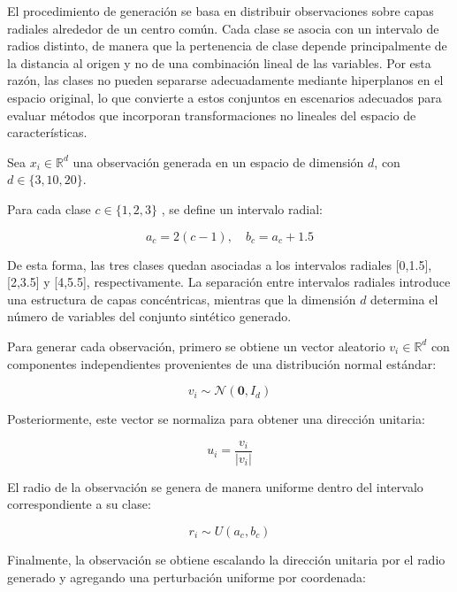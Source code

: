 El procedimiento de generación se basa en distribuir observaciones sobre capas radiales alrededor de un centro común. Cada clase se asocia con un intervalo de radios distinto, de manera que la pertenencia de clase depende principalmente de la distancia al origen y no de una combinación lineal de las variables. Por esta razón, las clases no pueden separarse adecuadamente mediante hiperplanos en el espacio original, lo que convierte a estos conjuntos en escenarios adecuados para evaluar métodos que incorporan transformaciones no lineales del espacio de características.

Sea $x_i \in \mathbb{R}^d$ una observación generada en un espacio de dimensión $d$, con $d \in \{3,10,20\}$.

Para cada clase $c \in \{1,2,3\}$ , se define un intervalo radial:

\begin{equation}
	a_c = 2(c-1), \quad b_c = a_c + 1.5
	\label{eq:EM15}
\end{equation}

De esta forma, las tres clases quedan asociadas a los intervalos radiales [0,1.5], [2,3.5] y [4,5.5], respectivamente. La separación entre intervalos radiales introduce una estructura de capas concéntricas, mientras que la dimensión $d$ determina el número de variables del conjunto sintético generado.

Para generar cada observación, primero se obtiene un vector aleatorio $v_i \in \mathbb{R}^d$ con componentes independientes provenientes de una distribución normal estándar:

\begin{equation}
	v_i \sim \mathcal{N}(\mathbf{0}, I_d)	
	\label{eq:EM16}
\end{equation}

Posteriormente, este vector se normaliza para obtener una dirección unitaria:

\begin{equation}
	u_i = \frac{v_i}{|v_i|}	
	\label{eq:EM17}
\end{equation}

El radio de la observación se genera de manera uniforme dentro del intervalo correspondiente a su clase:

\begin{equation}
	r_i \sim U(a_c,b_c)	
	\label{eq:EM18}
\end{equation}

Finalmente, la observación se obtiene escalando la dirección unitaria por el radio generado y agregando una perturbación uniforme por coordenada:

